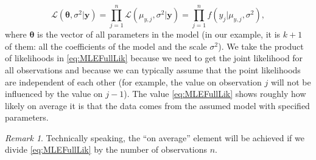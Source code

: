 \documentclass[
]{book}
\theoremstyle{definition}
\theoremstyle{definition}
\theoremstyle{definition}
\theoremstyle{definition}
\theoremstyle{remark}
\newtheorem*{remark}{Remark}
\begin{document}
\begin{equation}
    \mathcal{L} (\boldsymbol{\theta}, {\sigma}^2 | \mathbf{y}) = \prod_{j=1}^n \mathcal{L} (\mu_{y,j}, \sigma^2 | \mathbf{y}) = \prod_{j=1}^n f(y_j | \mu_{y,j}, \sigma^2),
    \label{eq:MLEFullLik}
\end{equation}
where \(\boldsymbol{\theta}\) is the vector of all parameters in the model (in our example, it is \(k+1\) of them: all the coefficients of the model and the scale \(\sigma^2\)). We take the product of likelihoods in \eqref{eq:MLEFullLik} because we need to get the joint likelihood for all observations and because we can typically assume that the point likelihoods are independent of each other (for example, the value on observation \(j\) will not be influenced by the value on \(j-1\)). The value \eqref{eq:MLEFullLik} shows roughly how likely on average it is that the data comes from the assumed model with specified parameters.

\begin{remark}
Technically speaking, the ``on average'' element will be achieved if we divide \eqref{eq:MLEFullLik} by the number of observations \(n\).
\end{remark}
\end{document}
